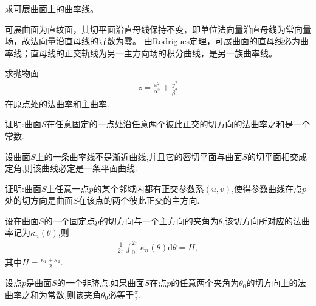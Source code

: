 \documentclass[../../main.tex]{subfiles}%
\begin{document}
\begin{example}
求可展曲面上的曲率线。
\end{example}
\begin{solution}
可展曲面为直纹面，其切平面沿直母线保持不变，即单位法向量沿直母线为常向量场，故法向量沿直母线的导数为零。
由Rodrigues定理，可展曲面的直母线必为曲率线；直母线的正交轨线为另一主方向场的积分曲线，是另一族曲率线。

\end{solution}

\begin{example}
求抛物面
\begin{align*}
z=\frac{x^2}{\alpha^2}+\frac{y^2}{\beta^2}
\end{align*}
在原点处的法曲率和主曲率.
\end{example}

\begin{example}
证明:曲面$S$在任意固定的一点处沿任意两个彼此正交的切方向的法曲率之和是一个常数.
\end{example}

\begin{example}
设曲面$S$上的一条曲率线不是渐近曲线,并且它的密切平面与曲面$S$的切平面相交成定角,则该曲线必定是一条平面曲线.
\end{example}

\begin{example}
证明:曲面$S$上任意一点$p$的某个邻域内都有正交参数系$(u,v)$,使得参数曲线在点$p$处的切方向是曲面$S$在该点的两个彼此正交的主方向.
\end{example}

\begin{example}
设在曲面$S$的一个固定点$p$的切方向与一个主方向的夹角为$\theta$,该切方向所对应的法曲率记为$\kappa_n(\theta)$,则
\begin{align*}
\frac{1}{2\pi}\int_{0}^{2\pi}\kappa_n(\theta)\mathrm{d}\theta = H,
\end{align*}
其中$H=\frac{\kappa_1+\kappa_2}{2}$.
\end{example}

\begin{example}
设点$p$是曲面$S$的一个非脐点.如果曲面$S$在点$p$的任意两个夹角为$\theta_0$的切方向上的法曲率之和为常数,则该夹角$\theta_0$必等于$\frac{\pi}{2}$.
\end{example}
\end{document}
